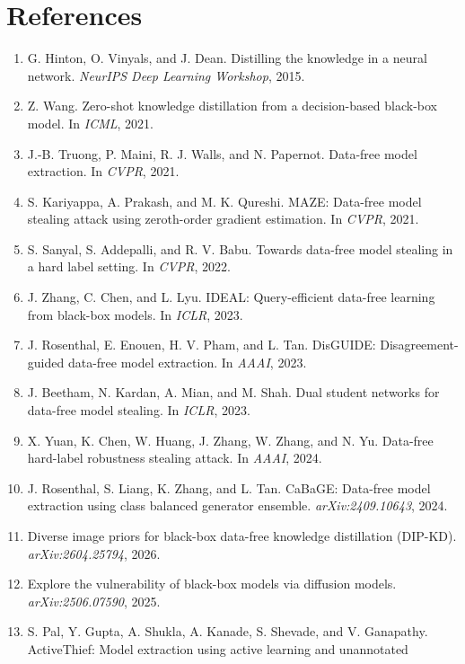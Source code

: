 \documentclass[
  10pt,
]{article}
\providecommand{\tightlist}{%
  \setlength{\itemsep}{0pt}\setlength{\parskip}{0pt}}
\begin{document}
\hypertarget{references}{%
\section*{References}\label{references}}

\begin{enumerate}
\def\labelenumi{\arabic{enumi}.}
\tightlist
\item
  G. Hinton, O. Vinyals, and J. Dean. Distilling the knowledge in a
  neural network. \emph{NeurIPS Deep Learning Workshop}, 2015.
\item
  Z. Wang. Zero-shot knowledge distillation from a decision-based
  black-box model. In \emph{ICML}, 2021.
\item
  J.-B. Truong, P. Maini, R. J. Walls, and N. Papernot. Data-free model
  extraction. In \emph{CVPR}, 2021.
\item
  S. Kariyappa, A. Prakash, and M. K. Qureshi. MAZE: Data-free model
  stealing attack using zeroth-order gradient estimation. In
  \emph{CVPR}, 2021.
\item
  S. Sanyal, S. Addepalli, and R. V. Babu. Towards data-free model
  stealing in a hard label setting. In \emph{CVPR}, 2022.
\item
  J. Zhang, C. Chen, and L. Lyu. IDEAL: Query-efficient data-free
  learning from black-box models. In \emph{ICLR}, 2023.
\item
  J. Rosenthal, E. Enouen, H. V. Pham, and L. Tan. DisGUIDE:
  Disagreement-guided data-free model extraction. In \emph{AAAI}, 2023.
\item
  J. Beetham, N. Kardan, A. Mian, and M. Shah. Dual student networks for
  data-free model stealing. In \emph{ICLR}, 2023.
\item
  X. Yuan, K. Chen, W. Huang, J. Zhang, W. Zhang, and N. Yu. Data-free
  hard-label robustness stealing attack. In \emph{AAAI}, 2024.
\item
  J. Rosenthal, S. Liang, K. Zhang, and L. Tan. CaBaGE: Data-free model
  extraction using class balanced generator ensemble.
  \emph{arXiv:2409.10643}, 2024.
\item
  Diverse image priors for black-box data-free knowledge distillation
  (DIP-KD). \emph{arXiv:2604.25794}, 2026.
\item
  Explore the vulnerability of black-box models via diffusion models.
  \emph{arXiv:2506.07590}, 2025.
\item
  S. Pal, Y. Gupta, A. Shukla, A. Kanade, S. Shevade, and V. Ganapathy.
  ActiveThief: Model extraction using active learning and unannotated

\end{enumerate}
\end{document}

